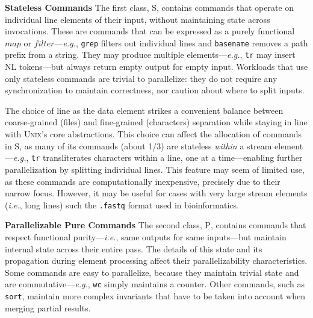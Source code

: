 \documentclass[sigplan, review, screen, anonymous]{acmart}
\newcommand{\eg}{{\em e.g.}, }
\newcommand{\ie}{{\em i.e.}, }
\newcommand{\heading}[1]{\vspace{4pt}\noindent\textbf{#1}\enspace}
\newcommand{\ttt}[1]{\texttt{#1}}
\newcommand{\cn}[1]{\mbox{\textcircled{\footnotesize #1}}}
\newcommand{\sta}{\cn{\textsc{S}}\xspace}
\newcommand{\pur}{\cn{\textsc{P}}\xspace}
\newcommand{\nv}[1]{[{\color{cyan}nv: #1}]}
\newcommand{\unix}{{\scshape Unix}\xspace}
\begin{document}

\heading{Stateless Commands}
The first class, \sta, contains commands that operate on individual line elements of their input, without maintaining state across invocations.
These are commands that can be expressed as a purely functional $map$ or $filter$---\eg \ttt{grep} filters out individual lines and \ttt{basename} removes a path prefix from a string.
They may produce multiple elements---\eg \ttt{tr} may insert {\sc NL} tokens---but always return empty output for empty input.
Workloads that use only stateless commands are trivial to parallelize:
  they do not require any synchronization to maintain correctness, nor caution about where to split inputs.

The choice of line as the data element strikes a convenient balance between coarse-grained (files) and fine-grained (characters) separation while staying in line with \unix's core abstractions.
This choice can affect the allocation of commands in \sta, as many of its commands (about 1/3) are stateless \emph{within} a stream element---\eg\ttt{tr} transliterates characters within a line, one at a time---enabling further parallelization by splitting individual lines.
This feature may seem of limited use, as these commands are computationally inexpensive, precisely due to their narrow focus.
However, it may be  useful for cases with very large stream elements (\ie long lines) such the \ttt{.fastq} format used in bioinformatics.


\heading{Parallelizable Pure Commands}
The second class, \pur, contains commands that respect functional purity---\ie same outputs for same inputs---but maintain internal state across their entire pass.
The details of this state and its propagation during element processing affect their parallelizability characteristics.
Some commands are easy to parallelize, because they maintain trivial state and are commutative---\eg \ttt{wc} simply maintains a counter.
Other commands, such as \ttt{sort}, maintain more complex invariants that have to be taken into account when merging partial results.
% 
\end{document}
